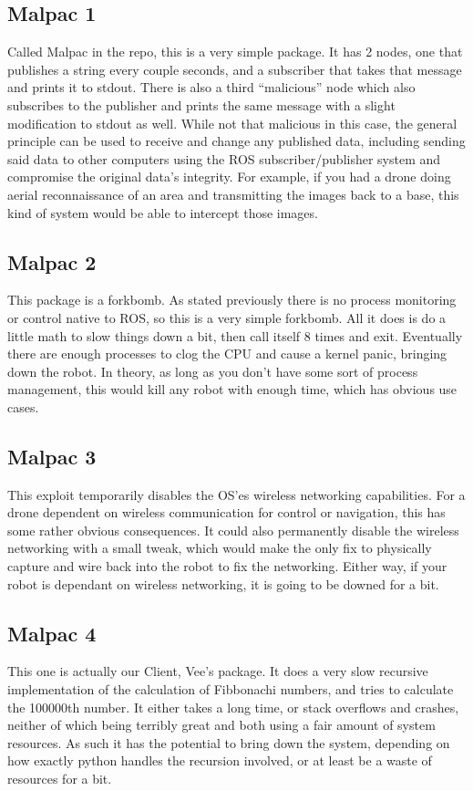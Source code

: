 \documentclass[IEEEtran,letterpaper,10pt,notitlepage,draftclsnofoot,onecolumn]{article}
\begin{document}
\subsection{Malpac 1}
Called Malpac in the repo, this is a very simple package. It has 2 nodes, one that publishes a string every couple seconds, and a subscriber that takes that message and prints it to stdout.
There is also a third “malicious” node which also subscribes to the publisher and prints the same message with a slight modification to stdout as well.
While not that malicious in this case, the general principle can be used to receive and change any published data, including sending said data to other computers using the ROS subscriber/publisher system and compromise the original data’s integrity.
For example, if you had a drone doing aerial reconnaissance of an area and transmitting the images back to a base, this kind of system would be able to intercept those images.

\subsection{Malpac 2}
This package is a forkbomb.
As stated previously there is no process monitoring or control native to ROS, so this is a very simple forkbomb. All it does is do a little math to slow things down a bit, then call itself 8 times and exit.
Eventually there are enough processes to clog the CPU and cause a kernel panic, bringing down the robot.
In theory, as long as you don’t have some sort of process management, this would kill any robot with enough time, which has obvious use cases.

\subsection{Malpac 3}
This exploit temporarily disables the OS’es wireless networking capabilities.
For a drone dependent on wireless communication for control or navigation, this has some rather obvious consequences.
It could also permanently disable the wireless networking with a small tweak, which would make the only fix to physically capture and wire back into the robot to fix the networking. Either way, if your robot is dependant on wireless networking,
it is going to be downed for a bit.

\subsection{Malpac 4}
This one is actually our Client, Vee's package. It does a very slow recursive implementation of the calculation of Fibbonachi
numbers, and tries to calculate the 100000th number. It either takes a long time, or stack overflows and crashes, neither 
of which being terribly great and both using a fair amount of system resources. As such it has the potential to bring down
the system, depending on how exactly python handles the recursion involved, or at least be a waste of resources for a bit.
\end{document}
